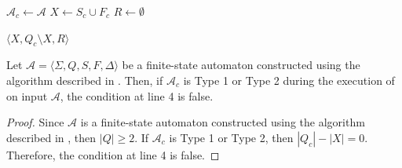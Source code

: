 \begin{algorithm}
  \caption{Finds a constant-size separator for the set of states of a finite-state
  automaton $\mathcal{A}$ constructed from a regular expression using the algorithm
  described in .}
  \label{alg:thompson_separator}

  \DontPrintSemicolon
  $\mathcal{A}_c \gets \mathcal{A}$\;
  $X \gets S_c \cup F_c$\;
  $R \gets \emptyset$\;

  \Return $\langle X, Q_c \setminus X, R \rangle$
\end{algorithm}

\begin{proposition}\label{prop:thompson_sep_1}
  Let $\mathcal{A} = \langle \Sigma, Q, S, F, \Delta \rangle$ be a finite-state
  automaton constructed using the algorithm described in . Then,
  if $\mathcal{A}_c$ is Type 1 or Type 2 during the execution of
   on input $\mathcal{A}$, the condition at line 4 is
  false.
\end{proposition}

\begin{proof}
  Since $\mathcal{A}$ is a finite-state automaton constructed using the algorithm
  described in , then $|Q| \geq 2$. If $\mathcal{A}_c$ is Type 1
  or Type 2, then $|Q_c| - |X| = 0$. Therefore, the condition at line 4 is false.
\end{proof}

